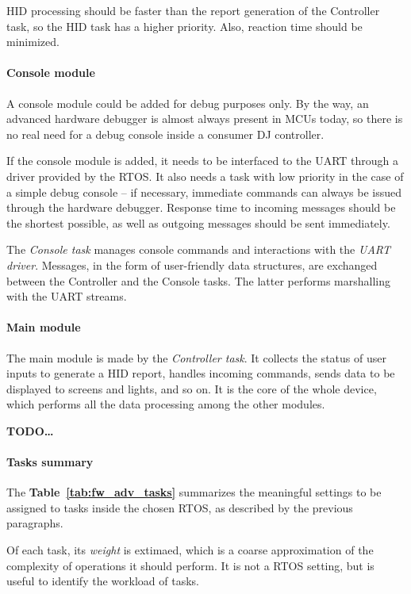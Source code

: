 \documentclass[a4paper,10pt]{article}
\newcommand{\TODO}{\textbf{TODO\dots\ }}
\newcommand{\citet}[1]{\textbf{Table~\ref{#1}}}
\begin{document}
\begin{multicols}{2}
HID processing should be faster than the report generation of the Controller
task, so the HID task has a higher priority. Also, reaction time should be
minimized.


\paragraph{Console module}
A console module could be added for debug purposes only. By the way, an
advanced hardware debugger is almost always present in MCUs today, so there is
no real need for a debug console inside a consumer DJ controller.

If the console module is added, it needs to be interfaced to the UART through
a driver provided by the RTOS. It also needs a task with low priority in the
case of a simple debug console -- if necessary, immediate commands can always
be issued through the hardware debugger. Response time to incoming messages
should be the shortest possible, as well as outgoing messages should be sent
immediately.

The \emph{Console task} manages console commands and interactions with the
\emph{UART driver}. Messages, in the form of user-friendly data structures,
are exchanged between the Controller and the Console tasks. The latter
performs marshalling with the UART streams. 


\paragraph{Main module}
The main module is made by the \emph{Controller task}. It collects the status
of user inputs to generate a HID report, handles incoming commands, sends data
to be displayed to screens and lights, and so on. It is the core of the whole
device, which performs all the data processing among the other modules.

\TODO


\paragraph{Tasks summary}
The \citet{tab:fw_adv_tasks} summarizes the meaningful settings to be assigned
to tasks inside the chosen RTOS, as described by the previous paragraphs.

Of each task, its \emph{weight} is extimaed, which is a coarse approximation
of the complexity of operations it should perform. It is not a RTOS setting,
but is useful to identify the workload of tasks.


\end{multicols}
\end{document}
